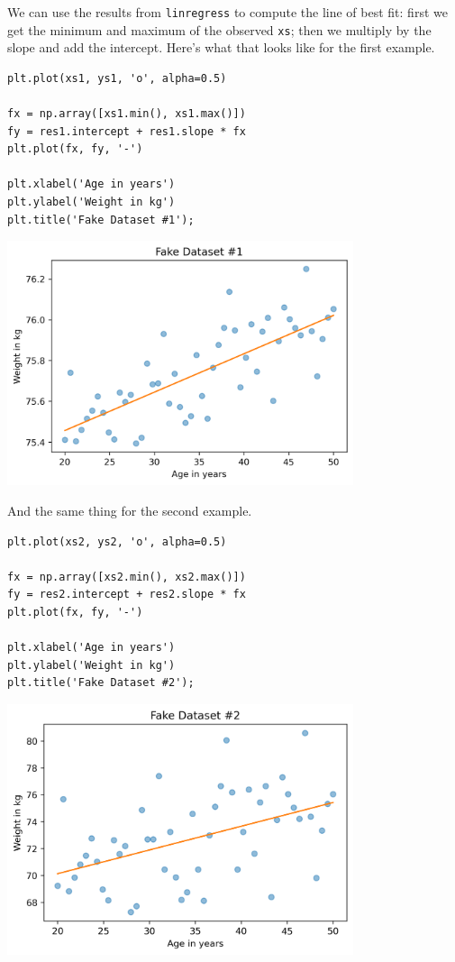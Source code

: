 We can use the results from \passthrough{\lstinline!linregress!} to
compute the line of best fit: first we get the minimum and maximum of
the observed \passthrough{\lstinline!xs!}; then we multiply by the slope
and add the intercept. Here's what that looks like for the first
example.

\begin{lstlisting}[]
plt.plot(xs1, ys1, 'o', alpha=0.5)

fx = np.array([xs1.min(), xs1.max()])
fy = res1.intercept + res1.slope * fx
plt.plot(fx, fy, '-')

plt.xlabel('Age in years')
plt.ylabel('Weight in kg')
plt.title('Fake Dataset #1');
\end{lstlisting}

\begin{center}
\includegraphics[width=4in]{chapters/09_relationships_files/09_relationships_88_0.png}
\end{center}

And the same thing for the second example.

\begin{lstlisting}[]
plt.plot(xs2, ys2, 'o', alpha=0.5)

fx = np.array([xs2.min(), xs2.max()])
fy = res2.intercept + res2.slope * fx
plt.plot(fx, fy, '-')

plt.xlabel('Age in years')
plt.ylabel('Weight in kg')
plt.title('Fake Dataset #2');
\end{lstlisting}

\begin{center}
\includegraphics[width=4in]{chapters/09_relationships_files/09_relationships_90_0.png}
\end{center}

